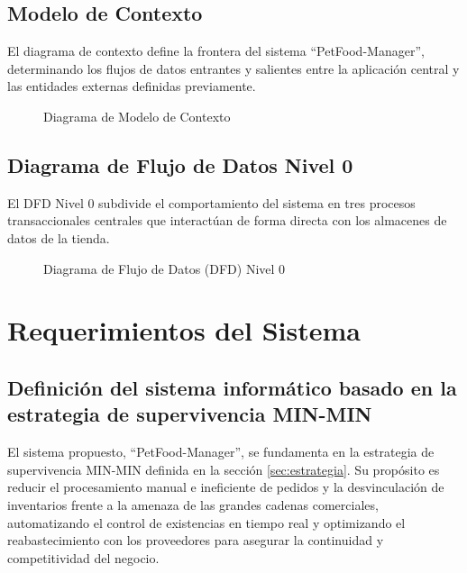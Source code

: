 \documentclass[11pt,a4paper]{article}
\newcommand{\placeholderfig}[2][5cm]{%
    \begin{center}
        \fbox{\parbox[c][#1][c]{0.9\linewidth}{\centering\itshape\textcolor{gray}{#2}}}
    \end{center}
}
\begin{document}
\subsection{Modelo de Contexto}
El diagrama de contexto define la frontera del sistema ``PetFood-Manager'', determinando los flujos de datos entrantes y salientes entre la aplicación central y las entidades externas definidas previamente.
\begin{figure}[H]
    \centering
    \placeholderfig[6cm]{Diagrama de Modelo de Contexto: Sistema PetFood-Manager y flujos de datos con Cliente, Administrador, SRI, Proveedor y Pasarela de Pago}
    \caption{Diagrama de Modelo de Contexto}
    \label{fig:modelo_contexto}
\end{figure}

\subsection{Diagrama de Flujo de Datos Nivel 0}
El DFD Nivel 0 subdivide el comportamiento del sistema en tres procesos transaccionales centrales que interactúan de forma directa con los almacenes de datos de la tienda.
\begin{figure}[H]
    \centering
    \placeholderfig[6.5cm]{DFD Nivel 0: Procesos (1.0 Procesar Venta, 2.0 Controlar Inventario, 3.0 Notificar Proveedor), Almacenes (Productos, Ventas, Proveedores) y Flujos de Datos}
    \caption{Diagrama de Flujo de Datos (DFD) Nivel 0}
    \label{fig:dfd_nivel_0}
\end{figure}

\newpage
\section{Requerimientos del Sistema}

\subsection{Definición del sistema informático basado en la estrategia de supervivencia MIN-MIN}
El sistema propuesto, ``PetFood-Manager'', se fundamenta en la estrategia de supervivencia MIN-MIN definida en la sección \ref{sec:estrategia}. Su propósito es reducir el procesamiento manual e ineficiente de pedidos y la desvinculación de inventarios frente a la amenaza de las grandes cadenas comerciales, automatizando el control de existencias en tiempo real y optimizando el reabastecimiento con los proveedores para asegurar la continuidad y competitividad del negocio.
\end{document}
